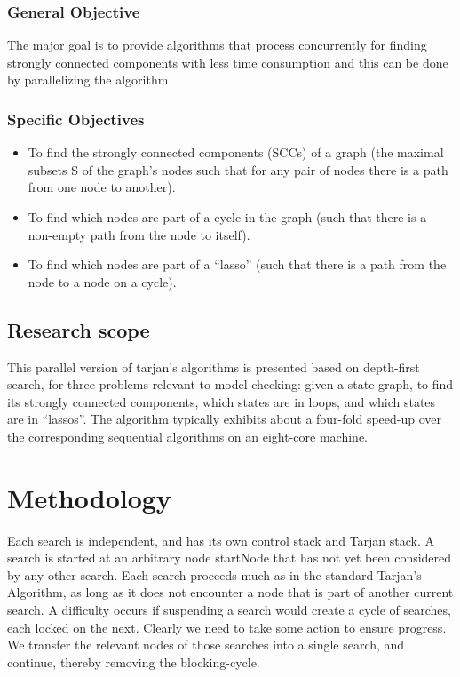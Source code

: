 \documentclass{article}
\begin{document}
\subsubsection{General Objective }{The major goal is to provide algorithms that process concurrently for finding strongly connected components \cite{ref1} with less time consumption and this can be done by parallelizing the algorithm}
\subsubsection{Specific Objectives}
\begin{itemize}

\item	To find the strongly connected components (SCCs) of a graph (the maximal subsets S of the graph’s nodes such that for any pair of nodes there is a path from one node to another).

\item To find which nodes are part of a cycle in the graph (such that there is a non-empty path from the node to itself).

\item  To find which nodes are part of a “lasso” (such that there is a path from the node to a node on a cycle).
\end{itemize}

\subsection{Research scope}{This parallel version of tarjan’s algorithms is presented based on depth-first search, for three problems relevant to model checking: given a state graph, to find its strongly connected components, which states are in loops, and which states are in “lassos”. The algorithm typically exhibits about a four-fold speed-up over the corresponding sequential algorithms on an eight-core machine\cite{ref3}.}

\section{Methodology}{Each search is independent, and has its own control stack and Tarjan stack. A search is started at an arbitrary node startNode that has not yet been considered by any other search. Each search proceeds much as in the standard Tarjan’s Algorithm, as long as it does not encounter a node that is part of another current search. A difficulty occurs if suspending a search would create a cycle of searches, each locked on the next. Clearly we need to take some action to ensure progress. We transfer the relevant nodes of those searches into a single search, and continue, thereby removing the blocking-cycle.}
\end{document}
